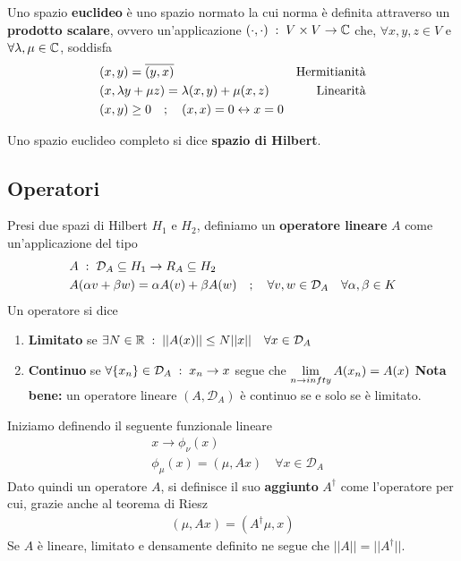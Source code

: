 Uno spazio \textbf{euclideo} è uno spazio normato la cui norma è definita attraverso un \textbf{prodotto scalare}, ovvero un'applicazione $ (\cdot , \cdot) \; : \; V \times V \rightarrow \mathbb{C} $ che, $\forall x,y,z \in V$ e $\forall \lambda, \mu \in \mathbb{C}$, soddisfa
\begin{align}
	&(x,y) = \overline{(y,x)} \quad &\text{Hermitianità}\\
	&(x, \lambda y + \mu z) = \lambda(x,y) + \mu (x,z) \quad &\text{Linearità}\\
	&(x,y) \geq 0 \quad ; \quad (x,x) = 0 \leftrightarrow x=0
\end{align}

Uno spazio euclideo completo si dice \textbf{spazio di Hilbert}.

\subsection{Operatori}

Presi due spazi di Hilbert $H_1$ e $H_2$, definiamo un \textbf{operatore lineare} $A$ come un'applicazione del tipo
\begin{align}
	&A \; : \; \mathcal{D}_A \subseteq H_1 \rightarrow R_A \subseteq H_2 \\
	&A(\alpha v + \beta w) = \alpha A(v) + \beta A(w) \quad ; \quad \forall v,w \in \mathcal{D}_A \quad \forall \alpha, \beta \in K
\end{align}
Un operatore si dice
\begin{enumerate}
	\item \textbf{Limitato} se $\exists N\in \mathbb{R} \; : \; ||A(x)|| \leq N||x|| \quad \forall x \in \mathcal{D}_A$
	\item \textbf{Continuo} se $\forall \{ x_n\} \in \mathcal{D}_A \; : \; x_n \rightarrow x$ segue che $\underset{n \rightarrow infty}{\lim} \, A(x_n) = A(x)$
		\textbf{Nota bene:} un operatore lineare $(A,\mathcal{D}_A)$ è continuo se e solo se è limitato.
\end{enumerate}

\newpage

Iniziamo definendo il seguente funzionale lineare
\begin{align}
	&x \rightarrow \phi_\nu(x)\\
	&\phi_\mu(x) = (\mu, Ax) \quad \forall x \in \mathcal{D}_A
\end{align}
Dato quindi un operatore $A$, si definisce il suo \textbf{aggiunto} $A^\dagger$ come l'operatore per cui, grazie anche al teorema di Riesz
\begin{align}
	(\mu, Ax) = (A^\dagger \mu, x)
\end{align}
Se $A$ è lineare, limitato e densamente definito ne segue che $||A|| = ||A^\dagger||$.

